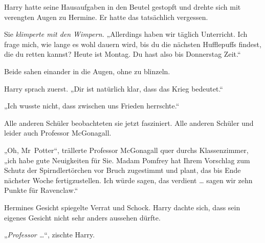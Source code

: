Harry hatte seine Hausaufgaben in den Beutel gestopft und drehte sich mit verengten Augen zu Hermine. Er hatte das tatsächlich vergessen.

Sie \emph{klimperte mit den Wimpern.}
„Allerdings haben wir täglich Unterricht. Ich frage mich, wie lange es wohl dauern wird, bis du die nächsten Hufflepuffs findest, die du retten kannst? Heute ist Montag. Du hast also bis Donnerstag Zeit.“

Beide sahen einander in die Augen, ohne zu blinzeln.

Harry sprach zuerst.
„Dir ist natürlich klar, dass das Krieg bedeutet.“

„Ich wusste nicht, dass zwischen uns Frieden herrschte.“

Alle anderen Schüler beobachteten sie jetzt fasziniert. Alle anderen Schüler und leider auch Professor McGonagall.

„Oh, Mr~Potter“, trällerte Professor McGonagall quer durchs Klassenzimmer, „ich habe gute Neuigkeiten für Sie. Madam Pomfrey hat Ihrem Vorschlag zum Schutz der Spirndlertörchen vor Bruch zugestimmt und plant, das bis Ende nächster Woche fertigzustellen. Ich würde sagen, das verdient … sagen wir zehn Punkte für Ravenclaw.“

Hermines Gesicht spiegelte Verrat und Schock. Harry dachte sich, dass sein eigenes Gesicht nicht sehr anders aussehen dürfte.

„\emph{Professor …}“, zischte Harry.

